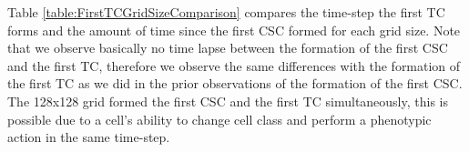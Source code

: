 \documentclass[\main/thesis.tex]{subfiles}
\begin{document}
Table \ref{table:FirstTCGridSizeComparison} compares the time-step the first TC forms and the amount of time since the first CSC formed for each grid size. Note that we observe basically no time lapse between the formation of the first CSC and the first TC, therefore we observe the same differences with the formation of the first TC as we did in the prior observations of the formation of the first CSC. The 128x128 grid formed the first CSC and the first TC simultaneously, this is possible due to a cell’s ability to change cell class and perform a phenotypic action in the same time-step.
\begin{table}[H]
\centering
{}
\caption{In this table we compare the time-step the first TC forms and the elapsed amount of time it takes a CSC to form the first TC between the various grid sizes.}
\label{table:FirstTCGridSizeComparison} 
\end{table}
\end{document}
